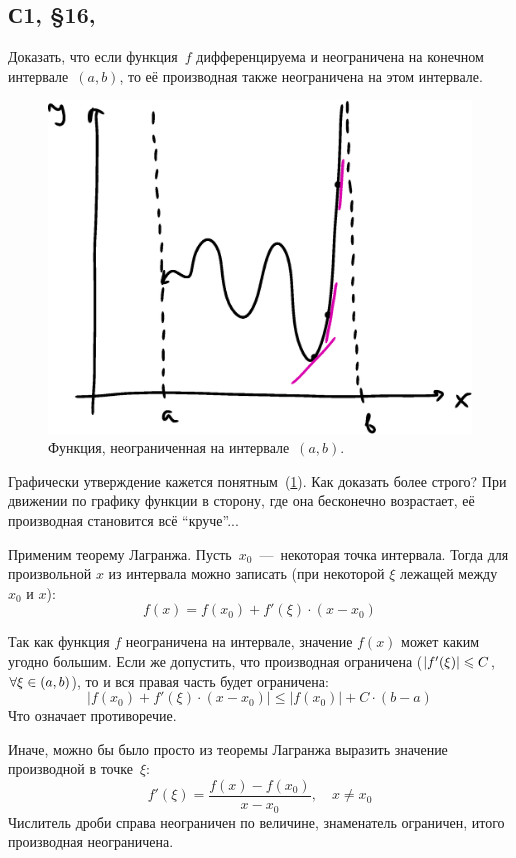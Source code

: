 \documentclass[a4paper,12pt]{article}
\begin{document}
  \subsection{С1, \S 16, }

  Доказать, что если функция~$f$ дифференцируема и неограничена на конечном интервале~$(a, b)$, то её производная также неограничена на этом интервале.
  
  \begin{solution}
    \begin{figure}
        \centering
        
        \includegraphics[width=0.8\linewidth]{images/unlimited-func}
        
        \caption{Функция, неограниченная на интервале~$(a, b)$.}
        \label{fig:unlimited-func}
    \end{figure}

    Графически утверждение кажется понятным~(\ref{fig:unlimited-func}).
    Как доказать более строго?
    При движении по графику функции в сторону, где она бесконечно возрастает, её производная становится всё ``круче''...

    Применим теорему Лагранжа.
    Пусть~$x_0$~---~некоторая точка интервала.
    Тогда для произвольной $x$ из интервала можно записать (при некоторой $\xi$ лежащей между $x_0$ и $x$):
    \[
      f(x) = f(x_0) + f'(\xi) \cdot (x - x_0)
    \]

    Так как функция $f$ неограничена на интервале, значение $f(x)$ может каким угодно большим.
    Если же допустить, что производная ограничена ($|f'(\xi)| \hm\leq C$, $\forall \xi \hm\in (a, b)$), то и вся правая часть будет ограничена:
    \[
      \bigl|f(x_0) + f'(\xi) \cdot (x - x_0)\bigr| \leq |f(x_0)| + C \cdot (b - a)
    \]
    Что означает противоречие.

    Иначе, можно бы было просто из теоремы Лагранжа выразить значение производной в точке~$\xi$:
    \[
      f'(\xi) = \frac{f(x) - f(x_0)}{x - x_0},\quad x \not= x_0
    \]
    Числитель дроби справа неограничен по величине, знаменатель ограничен, итого производная неограничена.
  \end{solution}
\end{document}
